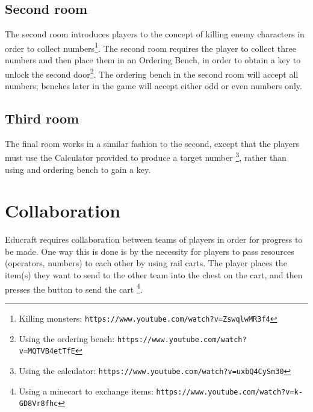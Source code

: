 \subsection{Second room}
The second room introduces players to the concept of killing enemy characters
in order to collect numbers\footnote{Killing monsters: \texttt{https://www.youtube.com/watch?v=ZswqlwMR3f4}}.
The second room requires the player to collect three numbers and then place them in
an Ordering Bench, in order to obtain a key to unlock the second
door\footnote{Using the ordering bench: \texttt{https://www.youtube.com/watch?v=MQTVB4etTfE}}.
The ordering bench in the second room will accept all numbers; benches later in the game
will accept either odd or even numbers only.

\subsection{Third room}
The final room works in a similar fashion to the second, except that the players
must use the Calculator provided to produce a target number
\footnote{Using the calculator: \texttt{https://www.youtube.com/watch?v=uxbQ4CySm30}},
rather than using and ordering bench to gain a key.


\section{Collaboration}
Educraft requires collaboration between teams of players in order for progress to be made.
One way this is done is by the necessity for players to pass resources (operators, numbers)
to each other by using rail carts. The player places the item(s) they want to send to the other
team into the chest on the cart, and then presses the button to send the cart
\footnote{Using a minecart to exchange items: \texttt{https://www.youtube.com/watch?v=k-GD8Vr8fhc}}.
